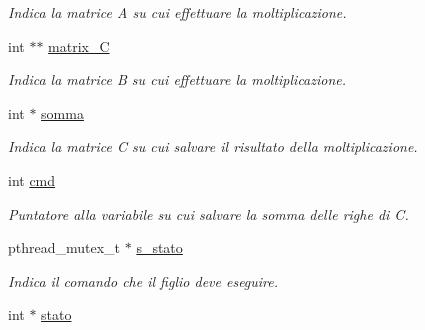 \begin{DoxyCompactItemize}
\begin{DoxyCompactList}\small\item\em Indica la matrice A su cui effettuare la moltiplicazione. \end{DoxyCompactList}\item 
int $\ast$$\ast$ \hyperlink{structcomando_acec686d8b1359432b25b89e02abdc973}{matrix\+\_\+C}\hypertarget{structcomando_acec686d8b1359432b25b89e02abdc973}{}\label{structcomando_acec686d8b1359432b25b89e02abdc973}

\begin{DoxyCompactList}\small\item\em Indica la matrice B su cui effettuare la moltiplicazione. \end{DoxyCompactList}\item 
int $\ast$ \hyperlink{structcomando_ae24ac8f066e13e7d8bf01f700285a5bf}{somma}\hypertarget{structcomando_ae24ac8f066e13e7d8bf01f700285a5bf}{}\label{structcomando_ae24ac8f066e13e7d8bf01f700285a5bf}

\begin{DoxyCompactList}\small\item\em Indica la matrice C su cui salvare il risultato della moltiplicazione. \end{DoxyCompactList}\item 
int \hyperlink{structcomando_ad8357a50a25044f2dc1c3c1175b44add}{cmd}\hypertarget{structcomando_ad8357a50a25044f2dc1c3c1175b44add}{}\label{structcomando_ad8357a50a25044f2dc1c3c1175b44add}

\begin{DoxyCompactList}\small\item\em Puntatore alla variabile su cui salvare la somma delle righe di C. \end{DoxyCompactList}\item 
pthread\+\_\+mutex\+\_\+t $\ast$ \hyperlink{structcomando_a574a62dc0a86db6cc73b79cbbf101d1e}{s\+\_\+stato}\hypertarget{structcomando_a574a62dc0a86db6cc73b79cbbf101d1e}{}\label{structcomando_a574a62dc0a86db6cc73b79cbbf101d1e}

\begin{DoxyCompactList}\small\item\em Indica il comando che il figlio deve eseguire. \end{DoxyCompactList}\item 
int $\ast$ \hyperlink{structcomando_a387b8fe797a197a43722686988e40b84}{stato}\hypertarget{structcomando_a387b8fe797a197a43722686988e40b84}{}\label{structcomando_a387b8fe797a197a43722686988e40b84}


\end{DoxyCompactItemize}
